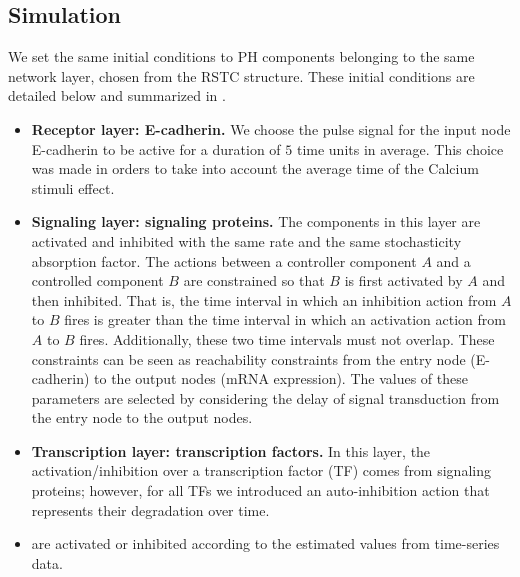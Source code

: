 \subsection{Simulation}

We set the same initial conditions to PH components belonging to the same network layer, chosen from the RSTC structure.
These initial conditions are detailed below and summarized in .
\begin{itemize}
 \item \textbf{Receptor layer: E-cadherin.} We choose the  pulse signal for the input node E-cadherin to be active for a duration of $5$ time units in average. This 
 choice was made in orders to take into account the average time of the Calcium stimuli effect.
 \item \textbf{Signaling layer: signaling proteins.} The components in this layer are activated and inhibited with the same rate and the same stochasticity absorption factor. 
The actions between a controller component $A$ and a controlled component $B$ are constrained so that 
$B$ is first activated by $A$ and then inhibited.  That is, 
the time interval in which an inhibition action from $A$ to $B$ fires is greater than 
the time interval in which an activation action from $A$ to $B$ fires.
Additionally, these two time intervals must not overlap.
These constraints can be seen as 
reachability constraints from the entry  node (E-cadherin) to the output nodes (mRNA expression). The values of these parameters are selected by considering the delay of signal transduction from the entry
 node to the output nodes.
 \item \textbf{Transcription layer: transcription factors.} In this layer, the activation/inhibition over a transcription factor (TF) comes from signaling proteins; however, 
for all TFs we introduced an auto-inhibition action that represents their degradation over time. 
 \item {} are activated or inhibited according to the estimated values from time-series data.
\end{itemize}


